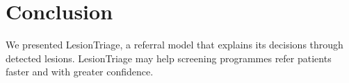 \section{Conclusion}

We presented LesionTriage, a referral model that explains its decisions through detected lesions.
LesionTriage may help screening programmes refer patients faster and with greater confidence.
